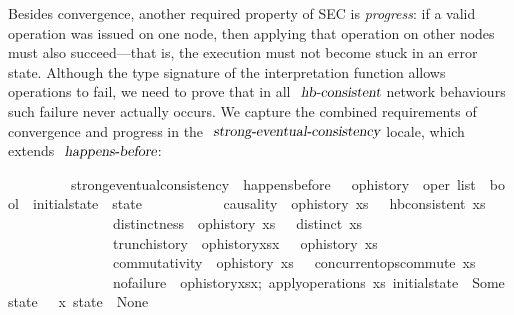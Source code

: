 Besides convergence, another required property of SEC is \emph{progress}: if a valid operation was issued on one node, then applying that operation on other nodes must also succeed---that is, the execution must not become stuck in an error state.
Although the type signature of the interpretation function allows operations to fail, we need to prove that in all $\isa{hb-consistent}$ network behaviours such failure never actually occurs.
We capture the combined requirements of convergence and progress in the $\isa{strong-eventual-consistency}$ locale, which extends $\isa{happens-before}$:
\vspace{0.35em}
\begin{isabellebody}
\ \ \ \ \ \ \ \ \ strong{\isacharunderscore}eventual{\isacharunderscore}consistency\ {\isacharequal}\ happens{\isacharunderscore}before\ {\isacharplus}\ \ op{\isacharunderscore}history\ {\isacharcolon}{\isacharcolon}\ {\isachardoublequoteopen}{\isacharprime}oper\ list\ {\isasymRightarrow}\ bool{\isachardoublequoteclose}\ \ initial{\isacharunderscore}state\ {\isacharcolon}{\isacharcolon}\ {\isachardoublequoteopen}{\isacharprime}state{\isachardoublequoteclose}\isanewline
\ \ \ \ \ \ \ \ \ \ \ causality{\isacharcolon}\ {\isasymlbrakk}\ {\isachardoublequoteopen}op{\isacharunderscore}history\ xs\ {\isasymrbrakk}\ {\isasymLongrightarrow}\ hb{\isacharunderscore}consistent\ xs{\isachardoublequoteclose}\isanewline
\ \ \ \ \ \ \ \ \ \ \ \ \ \ \ distinctness{\isacharcolon}\ {\isasymlbrakk}\ {\isachardoublequoteopen}op{\isacharunderscore}history\ xs\ {\isasymrbrakk}\ {\isasymLongrightarrow}\ distinct\ xs{\isachardoublequoteclose}\isanewline
\ \ \ \ \ \ \ \ \ \ \ \ \ \ \ trunc{\isacharunderscore}history{\isacharcolon}\ {\isasymlbrakk}\ {\isachardoublequoteopen}op{\isacharunderscore}history{\isacharparenleft}xs{\isacharat}{\isacharbrackleft}x{\isacharbrackright}{\isacharparenright}\ {\isasymrbrakk}\ {\isasymLongrightarrow}\ op{\isacharunderscore}history\ xs{\isachardoublequoteclose}\isanewline
\ \ \ \ \ \ \ \ \ \ \ \ \ \ \ commutativity{\isacharcolon}\ {\isasymlbrakk}\ {\isachardoublequoteopen}op{\isacharunderscore}history\ xs\ {\isasymrbrakk}\ {\isasymLongrightarrow}\ concurrent{\isacharunderscore}ops{\isacharunderscore}commute\ xs{\isachardoublequoteclose}\isanewline
  \ \ \ \ \ \ \ \ \ \ \ \ \ \ \ no{\isacharunderscore}failure{\isacharcolon}\ {\isasymlbrakk}\ {\isachardoublequoteopen}op{\isacharunderscore}history{\isacharparenleft}xs{\isacharat}{\isacharbrackleft}x{\isacharbrackright}{\isacharparenright};\ apply{\isacharunderscore}operations\ xs\ initial{\isacharunderscore}state\ {\isacharequal}\ Some\ state\ {\isasymrbrakk}\ {\isasymLongrightarrow}\ {\isasymlangle}x{\isasymrangle}\ state\ {\isasymnoteq}\ None{\isachardoublequoteclose}
\end{isabellebody}
